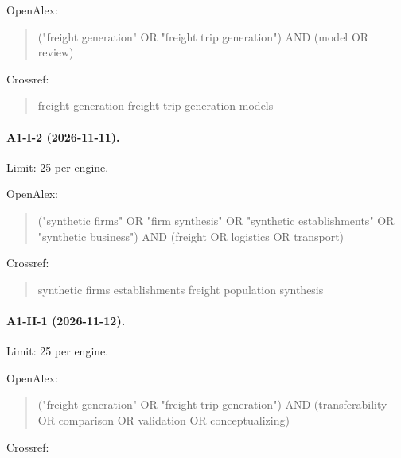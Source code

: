 \noindent OpenAlex:

\begin{quote}\footnotesize\ttfamily\raggedright

("freight generation" OR "freight trip generation") AND (model OR review)

\end{quote}

\noindent Crossref:

\begin{quote}\footnotesize\ttfamily\raggedright

freight generation freight trip generation models

\end{quote}

\paragraph{A1-I-2 (2026-11-11).} Limit: 25 per engine.

\noindent OpenAlex:

\begin{quote}\footnotesize\ttfamily\raggedright

("synthetic firms" OR "firm synthesis" OR "synthetic establishments" OR "synthetic business") AND (freight OR logistics OR transport)

\end{quote}

\noindent Crossref:

\begin{quote}\footnotesize\ttfamily\raggedright

synthetic firms establishments freight population synthesis

\end{quote}

\paragraph{A1-II-1 (2026-11-12).} Limit: 25 per engine.

\noindent OpenAlex:

\begin{quote}\footnotesize\ttfamily\raggedright

("freight generation" OR "freight trip generation") AND (transferability OR comparison OR validation OR conceptualizing)

\end{quote}

\noindent Crossref:

